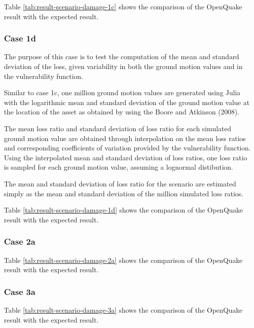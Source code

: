 Table \ref{tab:result-scenario-damage-1c} shows the comparison of the OpenQuake result with the expected result.

\subsubsection{Case 1d}
The purpose of this case is to test the computation of the mean and standard deviation of the loss, given variability in both the ground motion values and in the vulnerability function.

Similar to case 1c, one million ground motion values are generated using Julia with the logarithmic mean and standard deviation of the ground motion value at the location of the asset as obtained by using the Boore and Atkinson (2008).

The mean loss ratio and standard deviation of loss ratio for each simulated ground motion value are obtained through interpolation on the mean loss ratios and corresponding coefficients of variation provided by the vulnerability function. Using the interpolated mean and standard deviation of loss ratios, one loss ratio is sampled for each ground motion value, assuming a lognormal distibution.

The mean and standard deviation of loss ratio for the scenario are estimated simply as the mean and standard deviation of the million simulated loss ratios.



Table \ref{tab:result-scenario-damage-1d} shows the comparison of the OpenQuake result with the expected result.

\subsubsection{Case 2a}




Table \ref{tab:result-scenario-damage-2a} shows the comparison of the OpenQuake result with the expected result.

\subsubsection{Case 3a}




Table \ref{tab:result-scenario-damage-3a} shows the comparison of the OpenQuake result with the expected result.